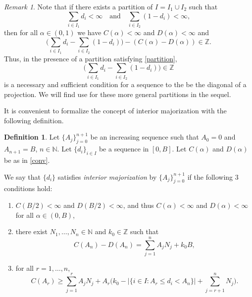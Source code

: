 \documentclass[12pt]{amsart}
\newcounter{Theorem}
\newcounter{Definition}
\numberwithin{equation}{section}
\numberwithin{Theorem}{section}
\theoremstyle{plain}
\theoremstyle{definition}
\newtheorem{defn}[Theorem]{Definition}
\theoremstyle{remark}
\newtheorem{remark}{Remark}[section]
\begin{document}
\begin{remark}\label{rpart}
Note that if there exists a partition of $I=I_{1}\cup I_{2}$ such that
\begin{equation}\label{partition}
\sum_{i\in I_{1}}d_{i}<\infty \quad\text{and}\quad\sum_{i\in I_{2}}(1-d_{i})<\infty,
\end{equation}
then for all $\alpha\in (0,1)$ we have $C(\alpha)<\infty$ and $D(\alpha)<\infty$ and
\[
\bigg(\sum_{i\in I_{1}} d_{i} - \sum_{i\in I_{2}}(1-d_{i}) \bigg) - (C(\alpha)-D(\alpha))\in{\mathbb{Z}}.
\]
Thus, in the presence of a partition satisfying \eqref{partition},
\[
\bigg(\sum_{i\in I_{1}} d_{i} - \sum_{i\in I_{2}}(1-d_{i}) \bigg) \in{\mathbb{Z}}
\]
is a necessary and sufficient condition for a sequence to the be the diagonal of a projection. We will find use for these more general partitions in the sequel.
\end{remark}

It is convenient to formalize the concept of interior majorization with the following definition.

\begin{defn}\label{mar}
Let $\{A_j\}_{j=0}^{n+1}$ be an increasing sequence such that $A_0=0$ and $A_{n+1}=B$, $n\in {\mathbb{N}}$. 
Let $\{d_i\}_{i\in I}$ be a sequence in $[0,B]$. Let $C(\alpha)$ and $D(\alpha)$ be as in \eqref{conv}. 

We say that $\{d_i\}$ satisfies {\it interior majorization} by $\{ A_j\}_{j=0}^{n+1}$ if the following 3 conditions hold:
\begin{enumerate}
\item
$C(B/2)<\infty$ and $D(B/2)<\infty$, and thus $C(\alpha)<\infty$ and $D(\alpha)< \infty$ for all $\alpha \in (0,B)$,
\item
there exist $N_1, \ldots, N_n \in{\mathbb{N}}$ and $k_0\in {\mathbb{Z}}$ such that
\begin{equation}
\label{fulltrace1} 
C(A_n) -D(A_n) =  \sum_{j = 1}^n A_j N_j +k_0 B,
\end{equation}
\item 
for all $r=1,\ldots,n$,
\begin{equation}
\label{fullmaj1} 
C(A_r) \ge\sum_{j=1}^{r} A_j N_j + A_r \bigg( k_0 - |\{i\in I: A_r \le d_i < A_n \}|+\sum_{j=r+1}^{n} N_j  \bigg).
\end{equation}
\end{enumerate}
\end{defn}
\end{document}
